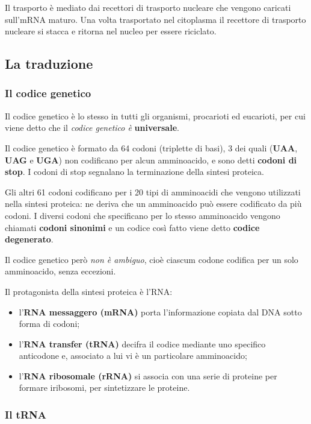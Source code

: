 \documentclass[]{article}
\begin{document}
Il trasporto è mediato dai recettori di trasporto nucleare che vengono
caricati sull'mRNA maturo. Una volta trasportato nel citoplasma il
recettore di trasporto nucleare si stacca e ritorna nel nucleo per
essere riciclato.

\subsection{La traduzione}\label{la-traduzione}

\subsubsection{Il codice genetico}\label{il-codice-genetico}

Il codice genetico è lo stesso in tutti gli organismi, procarioti ed
eucarioti, per cui viene detto che il \emph{codice genetico è}
\textbf{universale}.

Il codice genetico è formato da 64 codoni (triplette di basi), 3 dei
quali (\textbf{UAA}, \textbf{UAG} e \textbf{UGA}) non codificano per
alcun amminoacido, e sono detti \textbf{codoni di stop}. I codoni di
stop segnalano la terminazione della sintesi proteica.

Gli altri 61 codoni codificano per i 20 tipi di amminoacidi che vengono
utilizzati nella sintesi proteica: ne deriva che un amminoacido può
essere codificato da più codoni. I diversi codoni che specificano per lo
stesso amminoacido vengono chiamati \textbf{codoni sinonimi} e un codice
così fatto viene detto \textbf{codice degenerato}.

Il codice genetico però \emph{non è ambiguo}, cioè ciascum codone
codifica per un solo amminoacido, senza eccezioni.

Il protagonista della sintesi proteica è l'RNA:

\begin{itemize}
\itemsep1pt\parskip0pt
\item
  l'\textbf{RNA messaggero (mRNA)} porta l'informazione copiata dal DNA
  sotto forma di codoni;
\item
  l'\textbf{RNA transfer (tRNA)} decifra il codice mediante uno
  specifico anticodone e, associato a lui vi è un particolare
  amminoacido;
\item
  l'\textbf{RNA ribosomale (rRNA)} si associa con una serie di proteine
  per formare iribosomi, per sintetizzare le proteine.
\end{itemize}

\subsubsection{Il tRNA}\label{il-trna}
\end{document}
